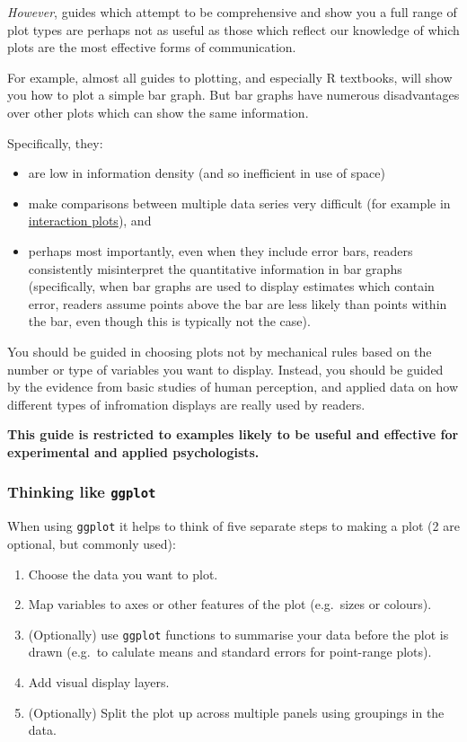 \documentclass[]{article}
\begin{document}
\emph{However}, guides which attempt to be comprehensive and show you a full range of
plot types are perhaps not as useful as those which reflect our knowledge of
which plots are the most effective forms of communication.

For example, almost all guides to plotting, and especially R textbooks, will
show you how to plot a simple bar graph. But bar graphs have numerous
disadvantages over other plots which can show the same information.

Specifically, they:

\begin{itemize}
\item
  are low in information density (and so inefficient in use of space)
\item
  make comparisons between multiple data series very difficult (for example in
  \protect\hyperlink{understanding-interactions}{interaction plots}), and
\item
  perhaps most importantly, even when they include error bars, readers
  consistently misinterpret the quantitative information in bar graphs
  (specifically, when bar graphs are used to display estimates which contain
  error, readers assume points above the bar are less likely than points
  within the bar, even though this is typically not the case).
\end{itemize}

You should be guided in choosing plots not by mechanical rules based on the
number or type of variables you want to display. Instead, you should be guided
by the evidence from basic studies of human perception, and applied data on how
different types of infromation displays are really used by readers.

\textbf{This guide is restricted to examples likely to be useful and effective for
experimental and applied psychologists.}

\hypertarget{thinking-like-ggplot}{%
\subsubsection*{\texorpdfstring{Thinking like \texttt{ggplot}}{Thinking like ggplot}}\label{thinking-like-ggplot}}

When using \texttt{ggplot} it helps to think of five separate steps to making a plot (2
are optional, but commonly used):

\begin{enumerate}
\def\labelenumi{\arabic{enumi}.}
\item
  Choose the data you want to plot.
\item
  Map variables to axes or other features of the plot (e.g.~sizes or colours).
\item
  (Optionally) use \texttt{ggplot} functions to summarise your data before the plot is
  drawn (e.g.~to calulate means and standard errors for point-range plots).
\item
  Add visual display layers.
\item
  (Optionally) Split the plot up across multiple panels using groupings in the
  data.
\end{enumerate}
\end{document}
